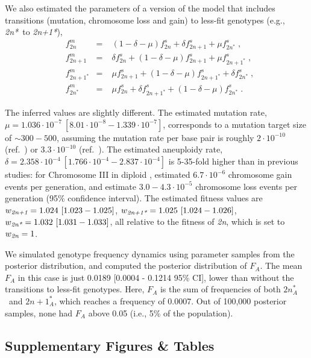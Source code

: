 \documentclass[12pt]{extarticle}
\newcommand{\euwt}{\emph{2n}}
\newcommand{\anwt}{\emph{2n+1}}
\newcommand{\eumt}{\emph{2n*}}
\newcommand{\eumtA}{\emph{$2n^*_A$}}
\newcommand{\anmt}{\emph{2n+1*}}
\begin{document}
We also estimated the parameters of a version of the model that includes transitions (mutation, chromosome loss and gain) to less-fit genotypes (e.g., \eumt\ to \anmt),
\begin{equation} \label{eq:mutation-aneuploidy-single}
    \begin{aligned}
      &f^m_{2n} &=&\; (1 - \delta - \mu) f^s_{2n} + \delta f^s_{2n+1} + \mu f^s_{2n^*} \;,\\
      &f^m_{2n+1} &=&\; \delta f^s_{2n} + (1 - \delta - \mu) f^s_{2n+1} + \mu f^s_{2n+1^*}  \;,\\
      &f^m_{2n+1^*} &=&\; \mu f^s_{2n+1} + (1 - \delta - \mu) f^s_{2n+1^*} + \delta f^s_{2n^*}  \;,\\
      &f^m_{2n^*} &=&\; \mu f^s_{2n} + \delta f^s_{2n+1^*} + (1 - \delta - \mu) f^s_{2n^*}  \;.
    \end{aligned}
    \end{equation}

The inferred values are slightly different.
The estimated mutation rate, $\mu=1.036\cdot10^{-7}\ [8.01\cdot10^{-8}-1.339\cdot10^{-7}]$, corresponds to a mutation target size of $\sim 300-500$, assuming the mutation rate per base pair is roughly $2\cdot10^{-10}$ (ref.~\citep{Zhu2014}) or $3.3\cdot10^{-10}$ (ref.~\citep{Lynch2008}).
The estimated aneuploidy rate, $\delta=2.358\cdot10^{-4}\ [1.766\cdot10^{-4}-2.837\cdot10^{-4}]$ is 5-35-fold higher than in previous studies: for Chromosome III in diploid \yeast, \citet{Zhu2014} estimated $6.7\cdot10^{-6}$ chromosome gain events per generation, and \citet{Kumaran2013} estimate $3.0-4.3\cdot10^{-5}$ chromosome loss events per generation (95\% confidence interval).
The estimated fitness values are 
$w_{\anwt}=1.024\ [1.023-1.025]$,
$w_{\anmt}=1.025\ [1.024-1.026]$,
$w_{\eumt}=1.032\ [1.031-1.033]$, all relative to the fitness of \euwt, which is set to $w_{\euwt}=1$. 

We simulated genotype frequency dynamics using parameter samples from the posterior distribution, and computed the posterior distribution of $F_A$. 
The mean $F_A$ in this case is just 0.0189 [0.0004 - 0.1214 95\% CI], lower than without the transitions to less-fit genotypes. Here, $F_A$ is the sum of frequencies of both \eumtA\ and $2n+1^*_A$, which reaches a frequency of 0.0007. Out of 100,000 posterior samples, none had $F_A$ above 0.05 (i.e., 5\% of the population).


\newpage
\subsection*{Supplementary Figures \& Tables}
\end{document}
